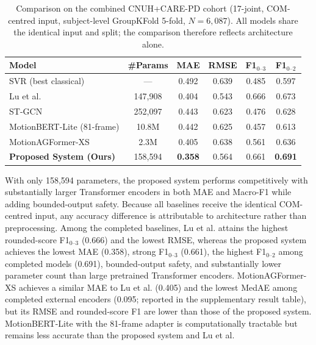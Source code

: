 \documentclass[preprint,12pt]{elsarticle}
\begin{document}
\begin{table}[htpb]
\centering
\caption{Comparison on the combined CNUH+CARE-PD cohort (17-joint, COM-centred input,
subject-level GroupKFold 5-fold, $N=6{,}087$). All models share the identical
input and split; the comparison therefore reflects architecture alone.}
\label{tab:comparison}
\begin{tabular}{lccccc}
\toprule
\textbf{Model} & \textbf{\#Params} & \textbf{MAE} & \textbf{RMSE} &
\textbf{F1$_{0\text{--}3}$} & \textbf{F1$_{0\text{--}2}$} \\
\midrule
SVR (best classical)              & ---     & 0.492 & 0.639 & 0.485 & 0.597 \\
Lu et al.\ \cite{lu2020vision}    & 147{,}908 & 0.404 & 0.543 & 0.666 & 0.673 \\
ST-GCN \cite{yan2018spatial}      & 252{,}097 & 0.443 & 0.623 & 0.476 & 0.628 \\
MotionBERT-Lite (81-frame) \cite{zhu2023motionbert}        & 10.8M & 0.442 & 0.625 & 0.457 & 0.613 \\
MotionAGFormer-XS \cite{mehraban2024motionagformer} & 2.3M & 0.405 & 0.638 & 0.561 & 0.636 \\
\midrule
\textbf{Proposed System (Ours)}   & 158{,}594 & \textbf{0.358} & 0.564 & 0.661 & \textbf{0.691} \\
\bottomrule
\end{tabular}
\end{table}

With only 158{,}594 parameters, the proposed system performs competitively with
substantially larger Transformer encoders in both MAE and Macro-F1 while adding
bounded-output safety. Because all baselines receive the identical COM-centred
input, any accuracy difference is attributable to architecture rather than
preprocessing.
Among the completed baselines, Lu et al. attains the highest rounded-score
F1$_{0\text{--}3}$ (0.666) and the lowest RMSE, whereas the proposed system
achieves the lowest MAE (0.358), strong F1$_{0\text{--}3}$ (0.661), the highest
F1$_{0\text{--}2}$ among completed models (0.691), bounded-output safety, and
substantially lower parameter count than large pretrained Transformer encoders.
MotionAGFormer-XS achieves a similar MAE to Lu et al. (0.405) and the lowest
MedAE among completed external encoders (0.095; reported in the supplementary
result table), but its RMSE and rounded-score F1 are lower than those of the
proposed system. MotionBERT-Lite with the 81-frame adapter is computationally
tractable but remains less accurate than the proposed system and Lu et al.
\end{document}
